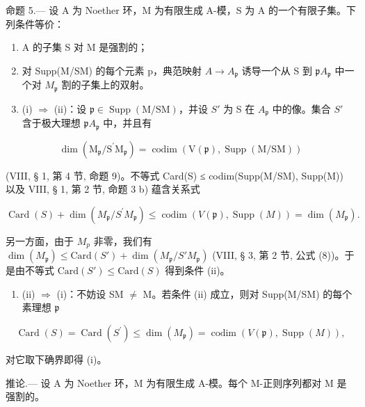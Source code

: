 命题 5.--- 设 A 为 Noether 环，M 为有限生成 A-模，S 为 A 的一个有限子集。下列条件等价：

\begin{enumerate}
\def\labelenumi{(\roman{enumi})}
\item
  A 的子集 S 对 M 是强割的；
\item
  对 Supp(M/SM) 的每个元素 p，典范映射 \(A \to A_{\mathfrak{p}}\) 诱导一个从 S 到 \(\mathfrak{p}A_{\mathfrak{p}}\) 中一个对 \(M_{\mathfrak{p}}\) 割的子集上的双射。
\item
  (i) \(\Rightarrow\) (ii)：设 \(\mathfrak{p} \in \operatorname{Supp}(\mathrm{M} / \mathrm{SM})\)，并设 \(S'\) 为 S 在 \(A_{\mathfrak{p}}\) 中的像。集合 \(S'\) 含于极大理想 \(\mathfrak{p} A_{\mathfrak{p}}\) 中，并且有
\end{enumerate}

\[
\dim (\mathrm{M} _ {\mathfrak {p}} / \mathrm{S} ^ {\prime} \mathrm{M} _ {\mathfrak {p}}) = \operatorname{codim} (\mathrm{V} (\mathfrak {p}), \operatorname{Supp} (\mathrm{M} / \mathrm{SM}))
\]

(VIII, § 1, 第 4 节, 命题 9)。不等式 Card(S) ≤ codim(Supp(M/SM), Supp(M)) 以及 VIII, § 1, 第 2 节, 命题 3 b) 蕴含关系式

\[
\operatorname{Card} (S) + \dim \left(M _ {\mathfrak {p}} / S ^ {\prime} M _ {\mathfrak {p}}\right) \leqslant \operatorname{codim} \left(V (\mathfrak {p}), \operatorname{Supp} (M)\right) = \dim \left(M _ {\mathfrak {p}}\right).
\]

另一方面，由于 \(M_{p}\) 非零，我们有 \(\dim(M_{\mathfrak{p}}) \leqslant \text{Card}(S') + \dim(M_{\mathfrak{p}}/S'M_{\mathfrak{p}})\) (VIII, § 3, 第 2 节, 公式 (8))。于是由不等式 \(\text{Card}(S') \leqslant \text{Card}(S)\) 得到条件 (ii)。

\begin{enumerate}
\def\labelenumi{(\roman{enumi})}
\setcounter{enumi}{1}
\tightlist
\item
  (ii) \(\Rightarrow\) (i)：不妨设 SM \(\neq\) M。若条件 (ii) 成立，则对 Supp(M/SM) 的每个素理想 \(\mathfrak{p}\)
\end{enumerate}

\[
\operatorname{Card} (S) = \operatorname{Card} \left(S ^ {\prime}\right) \leqslant \dim \left(M _ {\mathfrak {p}}\right) = \operatorname{codim} (V (\mathfrak {p}), \operatorname{Supp} (M)),
\]

对它取下确界即得 (i)。

推论.--- 设 A 为 Noether 环，M 为有限生成 A-模。每个 M-正则序列都对 M 是强割的。


